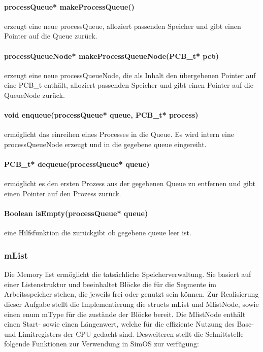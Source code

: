 \paragraph{processQueue* makeProcessQueue()} erzeugt eine neue processQueue, alloziert passenden Speicher und gibt einen Pointer auf die Queue zurück.

\paragraph{processQueueNode* makeProcessQueueNode(PCB\_t* pcb)} erzeugt eine neue processQueueNode, die als Inhalt den übergebenen Pointer auf eine PCB\_t enthält, alloziert passenden Speicher und gibt einen Pointer auf die QueueNode zurück.

\paragraph{void enqueue(processQueue* queue, PCB\_t* process)} ermöglicht das einreihen eines Processes in die Queue. Es wird intern eine processQueueNode erzeugt und in die gegebene queue eingereiht.

\paragraph{PCB\_t* dequeue(processQueue* queue)} ermöglicht es den ersten Prozess aus der gegebenen Queue zu entfernen und gibt einen Pointer auf den Prozess zurück.

\paragraph{Boolean isEmpty(processQueue* queue)} eine Hilfsfunktion die zurückgibt ob gegebene queue leer ist.


\subsubsection{mList}

Die Memory list ermöglicht die tatsächliche Speicherverwaltung. Sie basiert auf einer Listenstruktur und beeinhaltet Blöcke die für die Segmente im Arbeitsspeicher stehen, die jeweils frei oder genutzt sein können.
Zur Realisierung dieser Aufgabe stellt die Implementierung die structs mList und MlistNode, sowie einen enum mType für die zustände der Blöcke bereit. Die MlistNode enthält einen Start- sowie einen Längenwert, welche für die effiziente Nutzung des Base- und Limitregisters der CPU gedacht sind.
Desweiteren stellt die Schnittstelle folgende Funktionen zur Verwendung in SimOS zur verfügung:

